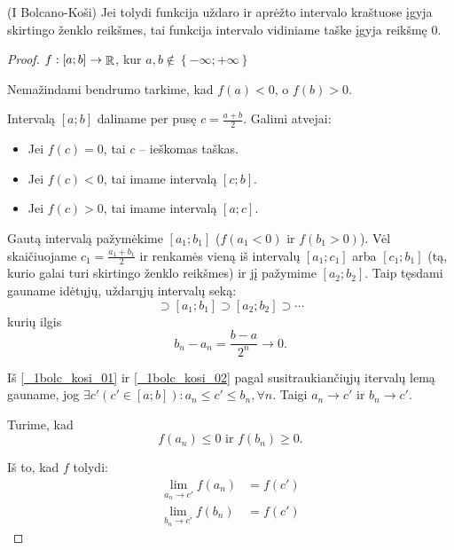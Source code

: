 \begin{prop}
  (I Bolcano-Koši) Jei tolydi funkcija uždaro ir aprėžto intervalo 
  kraštuose įgyja skirtingo ženklo reikšmes, tai funkcija intervalo
  vidiniame taške įgyja reikšmę 0.

  \begin{proof}
    $f : [a;b] \to \mathop{\mathbb{R}}$, kur 
    $a, b \notin \left\{ -\infty; +\infty \right\}$

    Nemažindami bendrumo tarkime, kad $f(a) < 0$, o $f(b) > 0$.

    Intervalą $[a;b]$ daliname per pusę $c = \frac{a + b}{2}$.
    Galimi atvejai:
    \begin{itemize}
      \item Jei $f(c) = 0$, tai $c$ – ieškomas taškas.
      \item Jei $f(c) < 0$, tai imame intervalą $[c;b]$.
      \item Jei $f(c) > 0$, tai imame intervalą $[a;c]$.
    \end{itemize}
    Gautą intervalą pažymėkime $[a_{1};b_{1}]$ 
    ($f(a_{1} < 0)$ ir $f(b_{1} > 0)$). Vėl skaičiuojame
    $c_{1} = \frac{a_{1} + b_{1}}{2}$ ir renkamės vieną iš intervalų
    $[a_{1};c_{1}]$ arba $[c_{1};b_{1}]$ (tą, kurio galai turi skirtingo
    ženklo reikšmes) ir jį pažymime $[a_{2}; b_{2}]$. Taip tęsdami gauname
    idėtųjų, uždarųjų intervalų seką:
    \begin{equation}
      [a;b] \supset [a_{1};b_{1}] \supset [a_{2};b_{2}] \supset \cdots
      \label{_1bolc_kosi_01}
    \end{equation}
    kurių ilgis
    \begin{equation}
      b_{n} - a_{n} = \frac{b - a}{2^{n}} \to 0.
      \label{_1bolc_kosi_02}
    \end{equation}

    Iš \ref{_1bolc_kosi_01} ir \ref{_1bolc_kosi_02} 
    pagal susitraukiančiųjų itervalų lemą gauname, jog 
    $\exists c' (c' \in [a;b]) : a_{n} \leq c' \leq b_{n}, \forall n$. 
    Taigi $a_{n} \to c'$ ir $b_{n} \to c'$.

    Turime, kad
    \begin{equation}
      f(a_{n}) \leq 0 \text{ ir } f(b_{n}) \geq 0.
      \label{_1bolc_kosi_03}
    \end{equation}

    Iš to, kad $f$ tolydi:
    \begin{align}
      \lim _{a_{n} \to c'} f(a_{n}) &= f(c')
      \label{_1bolc_kosi_04} \\
      \lim _{b_{n} \to c'} f(b_{n}) &= f(c')
      \label{_1bolc_kosi_05}
    \end{align}


\end{proof}
\end{prop}
